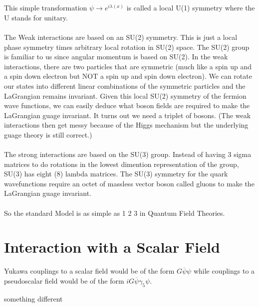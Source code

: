\documentclass{report}
\begin{document}
\\
\\
This simple transformation $\displaystyle \psi \to e^{i \lambda \left( x \right) }$ is called a local U(1) symmetry where the U stands for unitary.
\\
\\
The Weak interactions are based on an SU(2) symmetry. This is just a local phase symmetry times arbitrary local rotation in SU(2) space. The SU(2) group is familiar to us since angular momentum is based on SU(2). In the weak interactions, there are two particles that are symmetric (much like a spin up and a spin down electron but NOT a spin up and spin down electron). We can rotate our states into different linear combinations of the symmetric particles and the LaGrangian remains invariant. Given this local SU(2) symmetry of the fermion wave functions, we can easily deduce what boson fields are required to make the LaGrangian guage invariant. It turns out we need a triplet of bosons. (The weak interactions then get messy because of the Higgs mechanism but the underlying guage theory is still correct.)
\\
\\
The strong interactions are based on the SU(3) group. Instead of having 3 sigma matrices to do rotations in the lowest dimention representation of the group, SU(3) has eight (8) lambda matrices. The SU(3) symmetry for the quark wavefunctions require an octet of massless vector boson called gluons to make the LaGrangian guage invariant.
\\
\\
So the standard Model is as simple as 1 2 3 in Quantum Field Theories.

\section{Interaction with a Scalar Field}
Yukawa couplings to a scalar field would be of the form $\displaystyle G \overline{\psi} \psi$ while couplings to a pseudoscalar field would be of the form $\displaystyle iG \overline{\psi} \gamma_5 \psi$.

something different
\end{document}
